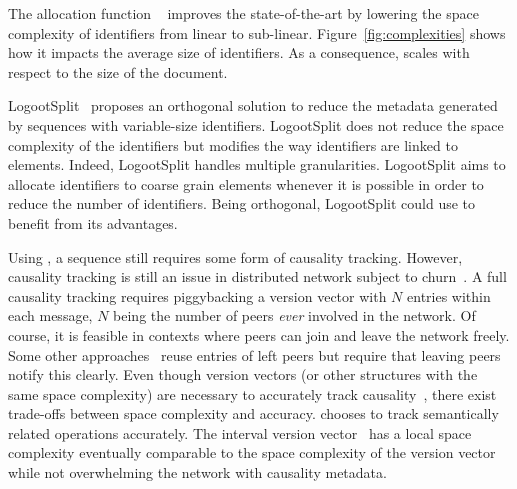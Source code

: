 The allocation function \LSEQ~\cite{nedelec2013lseq,nedelec2013concurrency}
improves the state-of-the-art by lowering the space complexity of identifiers
from linear to sub-linear. Figure~\ref{fig:complexities} shows how it impacts
the average size of identifiers. As a consequence, \LSEQ scales with respect
to the size of the document.

LogootSplit~\cite{andre2013supporting} proposes an orthogonal solution to
reduce the metadata generated by sequences with variable-size
identifiers. LogootSplit does not reduce the space complexity of the
identifiers but modifies the way identifiers are linked to elements. Indeed,
LogootSplit handles multiple granularities. LogootSplit aims to allocate
identifiers to coarse grain elements whenever it is possible in order to reduce
the number of identifiers. Being orthogonal, LogootSplit could use \LSEQ to
benefit from its advantages.

Using \LSEQ, a sequence still requires some form of causality
tracking. However, causality tracking is still an issue in distributed network
subject to churn~\cite{baldoni2002fundamentals}. A full causality tracking
requires piggybacking a version vector with $N$ entries within each message,
$N$ being the number of peers \emph{ever} involved in the network. Of course,
it is feasible in contexts where peers can join and leave the network
freely. Some other approaches~\cite{almeida2008interval} reuse entries of left
peers but require that leaving peers notify this clearly. Even though version
vectors (or other structures with the same space complexity) are necessary to
accurately track causality~\cite{charronbost1991concerning}, there exist
trade-offs between space complexity and accuracy. \CRATE chooses to
track semantically related operations accurately. The interval version
vector~\cite{mukund2014optimized} has a local space complexity eventually
comparable to the space complexity of the version vector while not overwhelming
the network with causality metadata.

